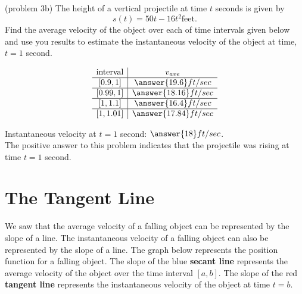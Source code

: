 \documentclass[handout]{ximera}
\begin{document}
\begin{problem}(problem 3b)
The height of a vertical projectile at time $t$ seconds is given by
\[
s(t) = 50t - 16t^2 \text{feet}.
\]
Find the average velocity of the object over each of time intervals given below and use you results to estimate the instantaneous velocity
of the object at time, $t = 1$ second.

\[
\begin{array}{ c | c  }
   \text{interval}& v_{ave} \\ 
	\hline
	[0.9, 1] & \answer{19.6}ft/sec \\
	\hline
	[0.99, 1] & \answer{18.16}ft/sec \\
	\hline
	[1, 1.1] & \answer{16.4}ft/sec \\
	\hline
	[1, 1.01] & \answer{17.84}ft/sec
\end{array}
\]


Instantaneous velocity at $t = 1$ second: $\answer{18}ft/sec$.\\
The positive answer to this problem indicates that the projectile was rising at time $t= 1$ second.

\end{problem}

\section{The Tangent Line}
We saw that the average velocity of a falling object can be represented by the slope of a line. 
The instantaneous velocity of a falling object can also be represented by the slope of a line.
The graph below represents the position function for a falling object.  
The slope of the blue \textbf{secant line} represents the average velocity of the object over the time interval $[a,b]$.
The slope of the red \textbf{tangent line} represents the instantaneous velocity of the object at time $t = b$.
\end{document}
